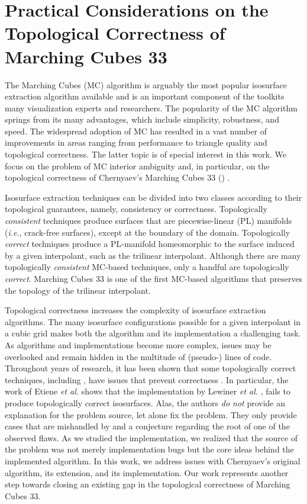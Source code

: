\chapter{Practical Considerations on the Topological Correctness of Marching Cubes 33}
\label{chap:mc33}

The Marching Cubes (MC) algorithm \cite{lor87} is arguably the most popular isosurface extraction algorithm available and is an important component of the toolkits many visualization experts and researchers. The popularity of the MC algorithm springs from  its many advantages, which include simplicity, robustness, and speed.  
%
The widespread adoption of MC has resulted in a vast number of improvements in areas ranging from performance to triangle quality and topological correctness. 
%
The latter topic is of special interest in this work. We focus on the problem of MC interior ambiguity and, in particular, on the topological correctness of Chernyaev's Marching Cubes 33 (\mc) \cite{Chernyaev95marchingcubes, Lewiner:2003}. 

Isosurface extraction techniques can be divided into two classes according to their topological guarantees, namely, consistency or correctness. Topologically \emph{consistent} techniques produce surfaces that are piecewise-linear (PL) manifolds (\emph{i.e.}, crack-free surfaces), except at the boundary of the domain. Topologically \emph{correct} techniques produce a PL-manifold homeomorphic to the surface induced by a given interpolant, such as the trilinear interpolant. Although there are many topologically \emph{consistent} MC-based techniques, only a handful are topologically \emph{correct}. Marching Cubes 33 is one of the first MC-based algorithms that preserves the topology of the trilinear interpolant.

Topological correctness increases the complexity of isosurface extraction algorithms. 
The many isosurface configurations possible for a given interpolant in a cubic grid makes both the algorithm and its implementation a challenging task. 
%
As algorithms and implementations become more complex, issues may be overlooked and remain hidden in the multitude of (pseudo-) lines of code.
%
Throughout years of research, it has been shown that some topologically correct techniques, including \mc, have issues that prevent correctness  \cite{Etiene:2012:TVI:2197070.2197097, lopes:tvcg:2003, newman:candg:2006}. 
%
In particular, the work of Etiene \emph{et al.} \cite{Etiene:2012:TVI:2197070.2197097} shows that the \mc{} implementation by Lewiner \emph{et al.} \cite{lewiner:impl,Lewiner:2003}, fails to produce topologically correct isosurfaces. 
%
Alas, the authors \emph{do not} provide an explanation for the problem source, let alone fix the problem. 
%
They only provide cases that are mishandled by \mc{} and a conjecture regarding  the root of one of the observed flaws.
%
As we studied the \mc{} implementation, we realized that the source of the problem was not merely implementation bugs but the core ideas behind the implemented algorithm.  
%
In this work, we address issues with Chernyaev's original algorithm, its extension, and its implementation. 
%
Our work represents another step towards closing an existing gap in the topological correctness of Marching Cubes 33.
 
